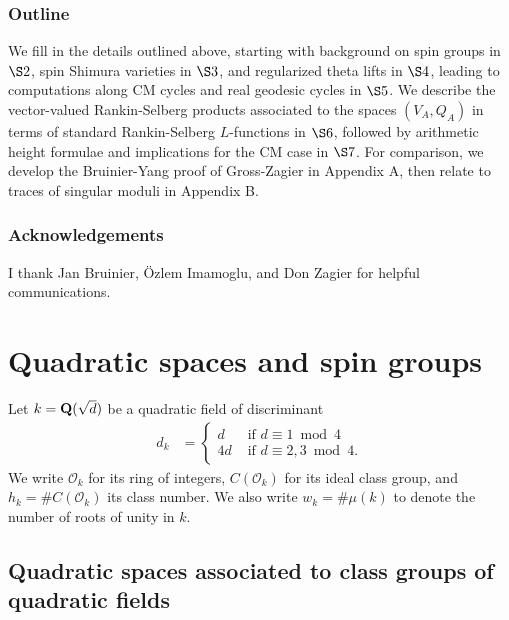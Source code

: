 \documentclass{amsart}
\theoremstyle{definition}
\theoremstyle{definition}
\theoremstyle{definition}
\begin{document}
\subsubsection{Outline} We fill in the details outlined above, starting with background on spin groups in $\S2$, spin Shimura varieties in $\S3$, and regularized theta lifts in $\S4$, 
leading to computations along CM cycles and real geodesic cycles in $\S5$. 
We describe the vector-valued Rankin-Selberg products associated to the spaces $(V_A, Q_A)$ in terms of standard Rankin-Selberg $L$-functions in $\S6$, 
followed by arithmetic height formulae and implications for the CM case in $\S7$. 
For comparison, we develop the Bruinier-Yang proof of Gross-Zagier in Appendix A, then relate to traces of singular moduli in Appendix B.

\subsubsection*{Acknowledgements} I thank Jan Bruinier, \"Ozlem Imamoglu, and Don Zagier for helpful communications.

\tableofcontents

\section{Quadratic spaces and spin groups}

Let $k = {\bf{Q}}(\sqrt{d})$ be a quadratic field of discriminant 
\begin{align*} d_k &= \begin{cases} d &\text{ if $d \equiv 1 \bmod 4$} \\ 4d &\text{ if $d \equiv 2,3 \bmod 4$}. \end{cases}\end{align*}
We write $\mathcal{O}_k$ for its ring of integers, $C(\mathcal{O}_k)$ for its ideal class group, and $h_k = \# C(\mathcal{O}_k)$ its class number.
We also write $w_k = \# \mu(k)$ to denote the number of roots of unity in $k$. 

\subsection{Quadratic spaces associated to class groups of quadratic fields}
   
\end{document}
